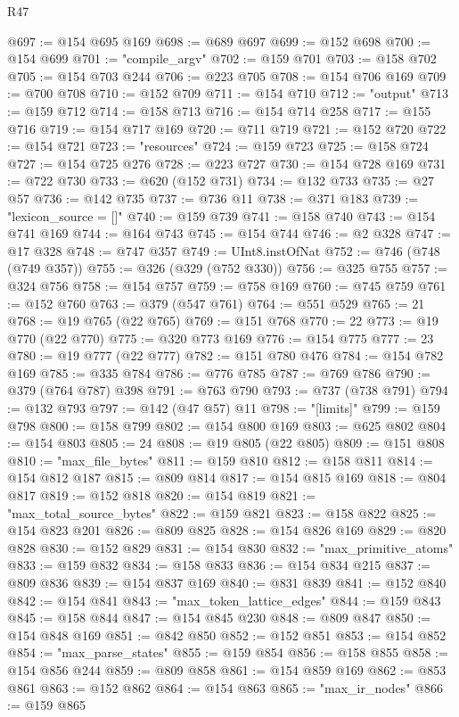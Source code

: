 \begin{lexlean}{R47}
\begin{coremodule}
@697 := @154 @695 @169
@698 := @689 @697
@699 := @152 @698
@700 := @154 @699
@701 := "compile_argv"
@702 := @159 @701
@703 := @158 @702
@705 := @154 @703 @244
@706 := @223 @705
@708 := @154 @706 @169
@709 := @700 @708
@710 := @152 @709
@711 := @154 @710
@712 := "output"
@713 := @159 @712
@714 := @158 @713
@716 := @154 @714 @258
@717 := @155 @716
@719 := @154 @717 @169
@720 := @711 @719
@721 := @152 @720
@722 := @154 @721
@723 := "resources"
@724 := @159 @723
@725 := @158 @724
@727 := @154 @725 @276
@728 := @223 @727
@730 := @154 @728 @169
@731 := @722 @730
@733 := @620 (@152 @731)
@734 := @132 @733
@735 := @27 @57
@736 := @142 @735
@737 := @736 @11
@738 := @371 @183
@739 := "lexicon_source = []"
@740 := @159 @739
@741 := @158 @740
@743 := @154 @741 @169
@744 := @164 @743
@745 := @154 @744
@746 := @2 @328
@747 := @17 @328
@748 := @747 @357
@749 := UInt8.instOfNat
@752 := @746 (@748 (@749 @357))
@755 := @326 (@329 (@752 @330))
@756 := @325 @755
@757 := @324 @756
@758 := @154 @757
@759 := @758 @169
@760 := @745 @759
@761 := @152 @760
@763 := @379 (@547 @761)
@764 := @551 @529
@765 := 21
@768 := @19 @765 (@22 @765)
@769 := @151 @768
@770 := 22
@773 := @19 @770 (@22 @770)
@775 := @320 @773 @169
@776 := @154 @775
@777 := 23
@780 := @19 @777 (@22 @777)
@782 := @151 @780 @476
@784 := @154 @782 @169
@785 := @335 @784
@786 := @776 @785
@787 := @769 @786
@790 := @379 (@764 @787) @398
@791 := @763 @790
@793 := @737 (@738 @791)
@794 := @132 @793
@797 := @142 (@47 @57) @11
@798 := "[limits]"
@799 := @159 @798
@800 := @158 @799
@802 := @154 @800 @169
@803 := @625 @802
@804 := @154 @803
@805 := 24
@808 := @19 @805 (@22 @805)
@809 := @151 @808
@810 := "max_file_bytes"
@811 := @159 @810
@812 := @158 @811
@814 := @154 @812 @187
@815 := @809 @814
@817 := @154 @815 @169
@818 := @804 @817
@819 := @152 @818
@820 := @154 @819
@821 := "max_total_source_bytes"
@822 := @159 @821
@823 := @158 @822
@825 := @154 @823 @201
@826 := @809 @825
@828 := @154 @826 @169
@829 := @820 @828
@830 := @152 @829
@831 := @154 @830
@832 := "max_primitive_atoms"
@833 := @159 @832
@834 := @158 @833
@836 := @154 @834 @215
@837 := @809 @836
@839 := @154 @837 @169
@840 := @831 @839
@841 := @152 @840
@842 := @154 @841
@843 := "max_token_lattice_edges"
@844 := @159 @843
@845 := @158 @844
@847 := @154 @845 @230
@848 := @809 @847
@850 := @154 @848 @169
@851 := @842 @850
@852 := @152 @851
@853 := @154 @852
@854 := "max_parse_states"
@855 := @159 @854
@856 := @158 @855
@858 := @154 @856 @244
@859 := @809 @858
@861 := @154 @859 @169
@862 := @853 @861
@863 := @152 @862
@864 := @154 @863
@865 := "max_ir_nodes"
@866 := @159 @865

\end{coremodule}
\end{lexlean}
